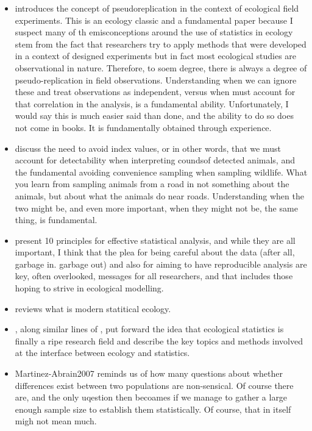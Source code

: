 \documentclass[
]{book}
\begin{document}
\begin{itemize}
\item
  \citet{Hurlbert1984} introduces the concept of pseudoreplication in the context of ecological field experiments. This is an ecology classic and a fundamental paper because I suspect many of th emisconceptions around the use of statistics in ecology stem from the fact that researchers try to apply methods that were developed in a context of designed experiments but in fact most ecological studies are observational in nature. Therefore, to soem degree, there is always a degree of pseudo-replication in field observations. Understanding when we can ignore these and treat observations as independent, versus when must account for that correlation in the analysis, is a fundamental ability. Unfortunately, I would say this is much easier said than done, and the ability to do so does not come in books. It is fundamentally obtained through experience.
\item
  \citet{AND2001} discuss the need to avoid index values, or in other words, that we must account for detectability when interpreting coundsof detected animals, and the fundamental avoiding convenience sampling when sampling wildlife. What you learn from sampling animals from a road in not something about the animals, but about what the animals do near roads. Understanding when the two might be, and even more important, when they might not be, the same thing, is fundamental.
\item
  \citet{Kass2016} present 10 principles for effective statistical analysis, and while they are all important, I think that the plea for being careful about the data (after all, garbage in. garbage out) and also for aiming to have reproducible analysis are key, often overlooked, messages for all researchers, and that includes those hoping to strive in ecological modelling.
\item
  \citet{King2014} reviews what is modern statitical ecology.
\item
  \citet{Gimenez2014}, along similar lines of \citet{King2014}, put forward the idea that ecological statistics is finally a ripe research field and describe the key topics and methods involved at the interface between ecology and statistics.
\item
  Martinez-Abrain2007 reminds us of how many questions about whether differences exist between two populations are non-sensical. Of course there are, and the only uqestion then becoames if we manage to gather a large enough sample size to establish them statistically. Of course, that in itself migh not mean much.

\end{itemize}
\end{document}
